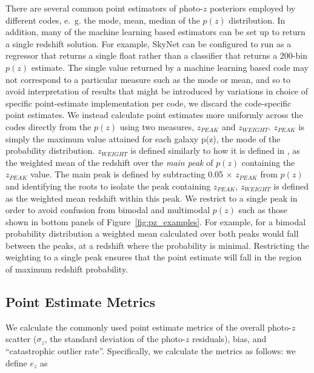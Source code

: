 \documentclass[usenatbib]{mn2e}
\newcommand{\red}[1]{\textcolor{red}{#1}}
\begin{document}
There are several common point estimators of photo-$z$ posteriors employed by different codes, e.~g. the mode, mean, median of the $p(z)$ distribution.  In addition, many of the machine learning based estimators can be set up to return a single redshift solution.  For example, SkyNet can be configured to run as a regressor that returns a single float rather than a classifier that returns a 200-bin $p(z)$ estimate.  The single value returned by a machine learning based code may not correspond to a particular measure such as the mode or mean, and so to avoid interpretation of results that might be introduced by variations in choice of specific point-estimate implementation per code, we discard the code-specific point estimates. We instead calculate point estimates more uniformly across the codes directly from the $p(z)$ using two measures, $z_{PEAK}$ and $z_{WEIGHT}$.  $z_{PEAK}$  is simply the maximum value attained for each galaxy p(z), the mode of the probability distribution.  $z_{WEIGHT}$ is defined similarly to how it is defined in \citet{Dahlen:13}, as the weighted mean of the redshift over the {\it main peak} of $p(z)$ containing the $z_{PEAK}$ value.  The main peak is defined by subtracting 0.05$\,\times\,z_{PEAK}$ from $p(z)$ and identifying the roots to isolate the peak containing $z_{PEAK}$, $z_{WEIGHT}$ is defined as the weighted mean redshift within this peak.  We restrict to a single peak in order to avoid confusion from bimodal and multimodal $p(z)$ such as those shown in bottom panels of Figure~\ref{fig:pz_examples}.  For example, for a bimodal probability distribution a weighted mean calculated over both peaks would fall between the peaks, at a redshift where the probability is minimal. Restricting the weighting to a single peak ensures that the point estimate will fall in the region of maximum redshift probability. %

 \subsection{Point Estimate Metrics}
 \label{sec:point_metrics}
We calculate the commonly used point estimate metrics of the overall photo-$z$ scatter ($\sigma_{z}$, the standard deviation of the photo-$z$ residuals), bias, and ``catastrophic outlier rate''.  Specifically, we calculate the metrics as follows:
we define $e_{z}$ as
\end{document}
